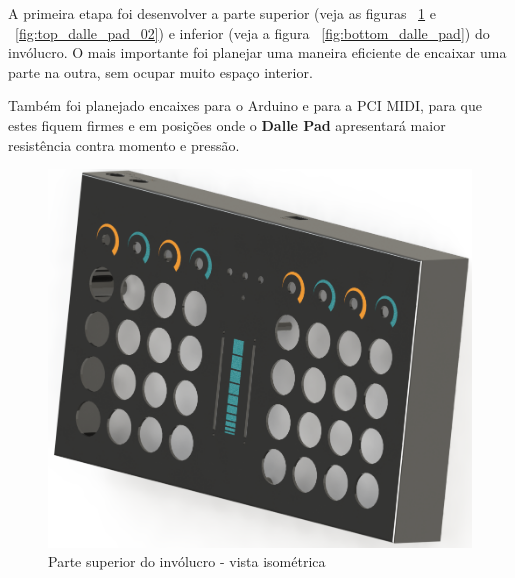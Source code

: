             A primeira etapa foi desenvolver a parte superior (veja as figuras ~\ref{fig:top_dalle_pad_01} e ~\ref{fig:top_dalle_pad_02}) e inferior (veja a figura ~\ref{fig:bottom_dalle_pad}) do invólucro. O mais importante foi planejar uma maneira eficiente de encaixar uma parte na outra, sem ocupar muito espaço interior.
            
            Também foi planejado encaixes para o Arduino e para a PCI MIDI, para que estes fiquem firmes e em posições onde o \textbf{Dalle Pad} apresentará maior resistência contra momento e pressão.
            
            \begin{figure}[H]
            	\centering
            	\includegraphics[scale=0.3]{Imagens/SW_Images/dalle_pad_capa_superior1.png}
            	\caption[Parte superior do invólucro - vista isométrica]{Parte superior do invólucro - vista isométrica}
            	\label{fig:top_dalle_pad_01}
            \end{figure}
            
